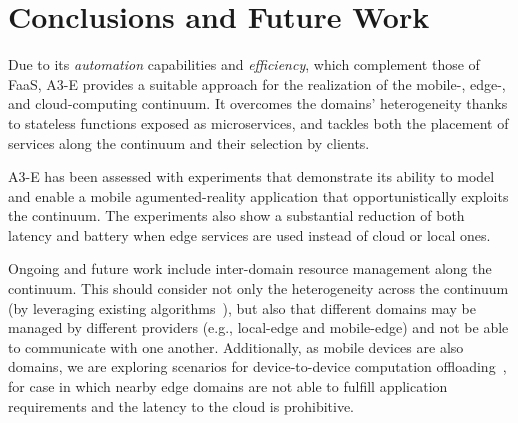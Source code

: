 \section{Conclusions and Future Work}\label{sec:conclusions}

Due to its \textit{automation} capabilities and \textit{efficiency}, which complement those of FaaS, A3-E provides a suitable approach for the realization of the mobile-, edge-, and cloud-computing continuum. It overcomes the domains' heterogeneity thanks to stateless functions exposed as microservices, and tackles both the placement of services along the continuum and their selection by clients.

A3-E has been assessed with experiments that demonstrate its ability to model and enable a mobile agumented-reality application that opportunistically exploits the continuum. The experiments also show a substantial reduction of both latency and battery when edge services are used instead of cloud or local ones. 

Ongoing and future work include inter-domain resource management along the continuum. This should consider not only the heterogeneity across the continuum (by leveraging existing algorithms~\cite{Tarneberg2017}), but also that different domains may be managed by different providers (e.g., local-edge and mobile-edge) and not be able to communicate with one another. Additionally, as mobile devices are also domains, we are exploring scenarios for device-to-device computation offloading~\cite{Mendonca2016A3droid}, for case in which nearby edge domains are not able to fulfill application requirements and the latency to the cloud is prohibitive.
